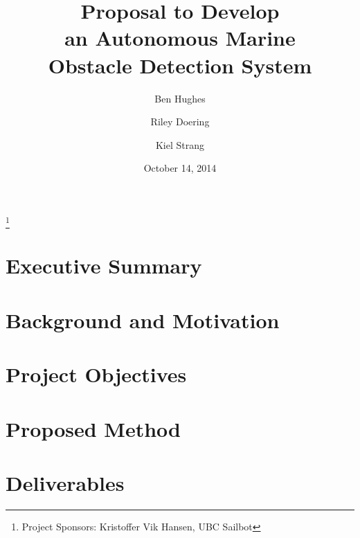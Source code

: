 \documentclass[amsmath, amssymb, aps, 12pt]{revtex4-1}
\begin{document}
\title{Proposal to Develop\\an Autonomous Marine\\Obstacle Detection System}
\author{Ben Hughes}
\thanks{Project Sponsors: Kristoffer Vik Hansen, UBC Sailbot}
\author{Riley Doering}
\author{Kiel Strang}
\date{October 14, 2014}
\maketitle


\section*{Executive Summary}


\newpage
\tableofcontents

\makeatletter
\let\toc@pre\relax
\let\toc@post\relax
\makeatother 

\newpage
\listoffigures
\listoftables

\clearpage
\newpage
{}






\section{\label{sec:intro}Background and Motivation}


\section{\label{sec:objectives}Project Objectives}


\section{\label{sec:method}Proposed Method}


\section{\label{sec:deliverables}Deliverables}

\end{document}
